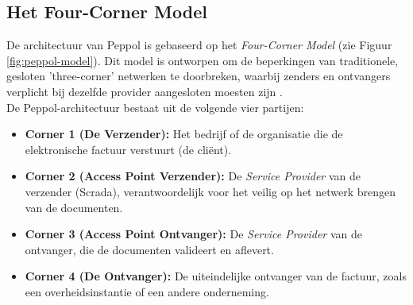 \subsection{Het Four-Corner Model}
De architectuur van Peppol is gebaseerd op het \textit{Four-Corner Model} (zie Figuur \ref{fig:peppol-model}). 
Dit model is ontworpen om de beperkingen van traditionele, gesloten 'three-corner' netwerken te doorbreken, 
waarbij zenders en ontvangers verplicht bij dezelfde provider aangesloten moesten zijn \autocite{PeppolEndUser2024}. \\
De Peppol-\-architectuur bestaat uit de volgende vier partijen:
\begin{itemize}
    \item \textbf{Corner 1 (De Verzender):} Het bedrijf of de organisatie die de elektronische factuur verstuurt (de cliënt).
    \item \textbf{Corner 2 (Access Point Verzender):} De \textit{Service Provider} van de verzender (Scrada), verantwoordelijk voor het veilig op het netwerk brengen van de documenten.
    \item \textbf{Corner 3 (Access Point Ontvanger):} De \textit{Service Provider} van de ontvanger, die de documenten valideert en aflevert.
    \item \textbf{Corner 4 (De Ontvanger):} De uiteindelijke ontvanger van de factuur, zoals een overheidsinstantie of een andere onderneming.
\end{itemize}

